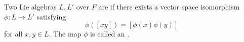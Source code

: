 Two Lie algebras $L, L'$ over $F$ are  if there exists a vector space isomorphism $\phi: L \to L'$ satisfying
$$\phi([xy]) = [\phi(x)\phi(y)]$$
for all $x, y \in L$. The map $\phi$ is called an .
